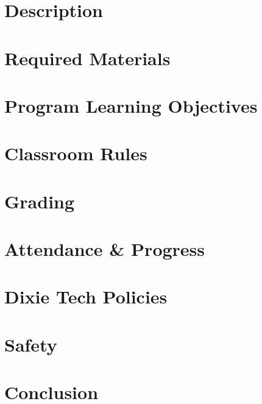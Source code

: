 \documentclass{article}
\begin{document}

\section*{Description}
\bline


\section*{Required Materials}


\section*{Program Learning Objectives}


\section*{Classroom Rules}


\section*{Grading}
\bline


\section*{Attendance \& Progress}
\bline


\section*{Dixie Tech Policies}
\bline


\section*{Safety}
\bline


\section*{Conclusion}
\bline

\end{document}
